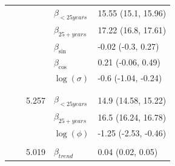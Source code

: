 \documentclass[a4paper,twoside,11pt]{report} %
\theoremstyle{definition}
\theoremstyle{definition}
\theoremstyle{definition}
\theoremstyle{definition}
\theoremstyle{remark}
\begin{document}
\begin{longtable}[t]{llrll}
\hspace{1em}\hspace{1em} &  &  & $\beta_{<25 years}$ & 15.55 (15.1, 15.96)\\

\hspace{1em}\hspace{1em} &  &  & $\beta_{25+ years}$ & 17.22 (16.8, 17.61)\\

\hspace{1em}\hspace{1em} &  &  & $\beta_{\sin}$ & -0.02 (-0.3, 0.27)\\

\hspace{1em}\hspace{1em} &  &  & $\beta_{\cos}$ & 0.21 (-0.06, 0.49)\\

\hspace{1em}\hspace{1em} &  &  & $\log(\sigma)$ & -0.6 (-1.04, -0.24)\\
\cmidrule{1-5}
\addlinespace[0.3em]
\multicolumn{5}{l}{\textit{\textbf{Poisson Gamma}}}\\
\addlinespace[0.3em]
\multicolumn{5}{l}{\begin{math}\log(\lambda_{it})=\beta(ageGroup_{i})+\log(n_{it})\end{math}}\\
\hspace{1em}\hspace{1em} &  & 5.257 & $\beta_{<25 years}$ & 14.9 (14.58, 15.22)\\

\hspace{1em}\hspace{1em} &  &  & $\beta_{25+ years}$ & 16.5 (16.24, 16.78)\\

\hspace{1em}\hspace{1em} &  &  & $\log(\phi)$ & -1.25 (-2.53, -0.46)\\
\cmidrule{2-5}
\addlinespace[0.3em]
\multicolumn{5}{l}{\begin{math}\log(\lambda_{it})=\beta(ageGroup_{i})+\beta_{trend} t +\log(n_{it})\end{math}}\\
\hspace{1em}\hspace{1em} &  & 5.019 & $\beta_{trend}$ & 0.04 (0.02, 0.05)\\


\end{longtable}
\end{document}
